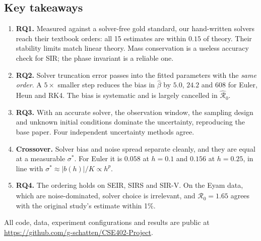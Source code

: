 \documentclass[sigconf]{acmart}
\newcommand{\repo}{\url{https://github.com/g-schatten/CSE402-Project}}
\begin{document}
\subsection{Key takeaways}
\begin{enumerate}
  \item \textbf{RQ1.} Measured against a solver-free gold standard, our
    hand-written solvers reach their textbook orders: all 15 estimates
    are within $0.15$ of theory. Their stability limits match linear
    theory. Mass conservation is a useless accuracy check for SIR; the
    phase invariant is a reliable one.
  \item \textbf{RQ2.} Solver truncation error passes into the fitted
    parameters with the \emph{same order}. A $5\times$ smaller step
    reduces the bias in $\hat\beta$ by $5.0$, $24.2$ and $608$ for
    Euler, Heun and RK4. The bias is systematic and is largely cancelled
    in $\hat{\mathcal R}_0$.
  \item \textbf{RQ3.} With an accurate solver, the observation window,
    the sampling design and unknown initial conditions dominate the
    uncertainty, reproducing the base paper. Four independent
    uncertainty methods agree.
  \item \textbf{Crossover.} Solver bias and noise spread separate
    cleanly, and they are equal at a measurable $\sigma^*$. For Euler it
    is $0.058$ at $h=0.1$ and $0.156$ at $h=0.25$, in line with
    $\sigma^*\approx|b(h)|/K\propto h^p$.
  \item \textbf{RQ4.} The ordering holds on SEIR, SIRS and SIR-V. On the
    Eyam data, which are noise-dominated, solver choice is irrelevant,
    and $\hat{\mathcal R}_0=1.65$ agrees with the original study's
    estimate within 1\%.
\end{enumerate}
All code, data, experiment configurations and results are public at
\repo.
\end{document}
